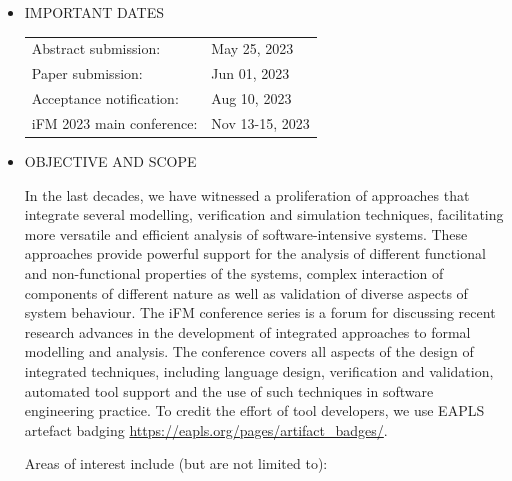 \documentclass[prodmode,acmtecs]{acmsmall} %
\begin{document}
\begin{itemize}\item  IMPORTANT DATES 
 
\begin{tabulary}{\linewidth}{LL}Abstract submission:  & May 25, 2023 \\
Paper submission:  & Jun 01, 2023 \\
Acceptance notification:  & Aug 10, 2023 \\
iFM 2023 main conference:  & Nov 13-15, 2023 \\
\end{tabulary}
 
\item  OBJECTIVE AND SCOPE  
 
  In the last decades, we have witnessed a proliferation of approaches that integrate several modelling, verification and simulation techniques, facilitating more versatile and efficient analysis of software-intensive systems. These approaches provide powerful support for the analysis of different functional and non-functional properties of the systems, complex interaction of components of different nature as well as validation of diverse aspects of system behaviour. The iFM conference series is a forum for discussing recent research advances in the development of integrated approaches to formal modelling and analysis. The conference covers all aspects of the design of integrated techniques, including language design, verification and validation, automated tool support and the use of such techniques in software engineering practice. To credit the effort of tool developers, we use EAPLS artefact badging \href{https://eapls.org/pages/artifact_badges/}{https://eapls.org/pages/artifact\_badges/}. 
 
  Areas of interest include (but are not limited to): 
 

\end{itemize}
\end{document}
